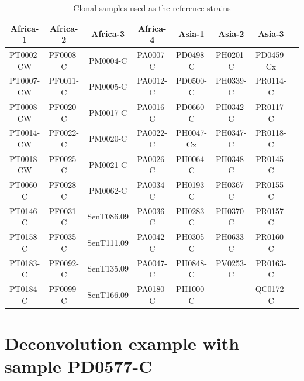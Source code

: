 \documentclass{article}
\begin{document}
\begin{table}[ht]
\centering
\begin{tabular}{|c|c|c|c|c|c|c|c|}
\hline\hline
Africa-1	&	Africa-2	&	Africa-3	&	Africa-4	&	Asia-1	&	Asia-2	&	Asia-3	\\
\hline
PT0002-CW	&	PF0008-C	&	PM0004-C	&	PA0007-C	&	PD0498-C	&	PH0201-C	&	PD0459-Cx	\\
PT0007-CW	&	PF0011-C	&	PM0005-C	&	PA0012-C	&	PD0500-C	&	PH0339-C	&	PR0114-C	\\
PT0008-CW	&	PF0020-C	&	PM0017-C	&	PA0016-C	&	PD0660-C	&	PH0342-C	&	PR0117-C	\\
PT0014-CW	&	PF0022-C	&	PM0020-C	&	PA0022-C	&	PH0047-Cx	&	PH0347-C	&	PR0118-C	\\
PT0018-CW	&	PF0025-C	&	PM0021-C	&	PA0026-C	&	PH0064-C	&	PH0348-C	&	PR0145-C	\\
PT0060-C	&	PF0028-C	&	PM0062-C	&	PA0034-C	&	PH0193-C	&	PH0367-C	&	PR0155-C	\\
PT0146-C	&	PF0031-C	&	SenT086.09	&	PA0036-C	&	PH0283-C	&	PH0370-C	&	PR0157-C	\\
PT0158-C	&	PF0035-C	&	SenT111.09	&	PA0042-C	&	PH0305-C	&	PH0633-C	&	PR0160-C	\\
PT0183-C	&	PF0092-C	&	SenT135.09	&	PA0047-C	&	PH0848-C	&	PV0253-C	&	PR0163-C	\\
PT0184-C	&	PF0099-C	&	SenT166.09	&	PA0180-C	&	PH1000-C	&		&	QC0172-C	\\
\hline\hline
\end{tabular}
\caption{Clonal samples used as the reference strains}\label{tab:panelSamples}
\end{table}


\section{Deconvolution example with sample PD0577-C}
\end{document}
